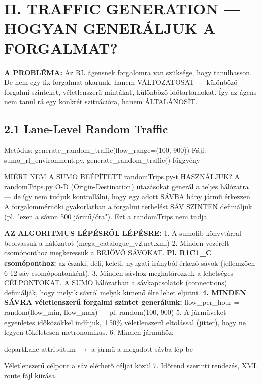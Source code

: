 \documentclass[11pt,a4paper]{article}
\begin{document}
\section*{II. TRAFFIC GENERATION — HOGYAN GENERÁLJUK A FORGALMAT?}

\textbf{A PROBLÉMA:}
Az RL ágensnek forgalomra van szüksége, hogy tanulhasson. De nem egy
fix forgalmat akarunk, hanem VÁLTOZATOSAT — különböző forgalmi
szinteket, véletlenszerű mintákat, különböző időtartamokat.
Így az ágens nem tanul rá egy konkrét szituációra, hanem ÁLTALÁNOSÍT.

\subsection*{2.1 Lane-Level Random Traffic}
Metódus: generate\_random\_traffic(flow\_range=(100, 900))
Fájl: sumo\_rl\_environment.py, generate\_random\_traffic() függvény

MIÉRT NEM A SUMO BEÉPÍTETT randomTrips.py-t HASZNÁLJUK?
A randomTrips.py O-D (Origin-Destination) utazásokat generál a
teljes hálózatra — de így nem tudjuk kontrollálni, hogy egy adott
SÁVBA hány jármű érkezzen. A forgalommérnöki gyakorlatban a
forgalmi terhelést SÁV SZINTEN definiáljuk (pl. "ezen a sávon
500 jármű/óra"). Ezt a randomTrips nem tudja.

\textbf{AZ ALGORITMUS LÉPÉSRŐL LÉPÉSRE:}
1. A sumolib könyvtárral beolvassuk a hálózatot (mega\_catalogue\_v2.net.xml)
2. Minden vezérelt csomóponthoz megkeressük a BEJÖVŐ SÁVOKAT.
\textbf{Pl. R1C1\_C csomóponthoz:} az északi, déli, keleti, nyugati
irányból érkező sávok (jellemzően 6-12 sáv csomópontonként).
3. Minden sávhoz meghatározzuk a lehetséges CÉLPONTOKAT.
A SUMO hálózatban a sávkapcsolatok (connections) definiálják,
hogy melyik sávról melyik kimenő élre lehet eljutni.
\textbf{4. MINDEN SÁVRA véletlenszerű forgalmi szintet generálunk:}
flow\_per\_hour = random(flow\_min, flow\_max) — pl. random(100, 900)
5. A járműveket egyenletes időközökkel indítjuk, ±50\% véletlenszerű
eltolással (jitter), hogy ne legyen tökéletesen metronomikus.
6. Minden járműhöz:
\par\noindent\hspace*{1em}\textbullet{} departLane attribútum $\rightarrow$ a jármű a megadott sávba lép be
\par\noindent\hspace*{1em}\textbullet{} Véletlenszerű célpont a sáv elérhető céljai közül
7. Időrend szerinti rendezés, XML route fájl kiírása.
\end{document}

